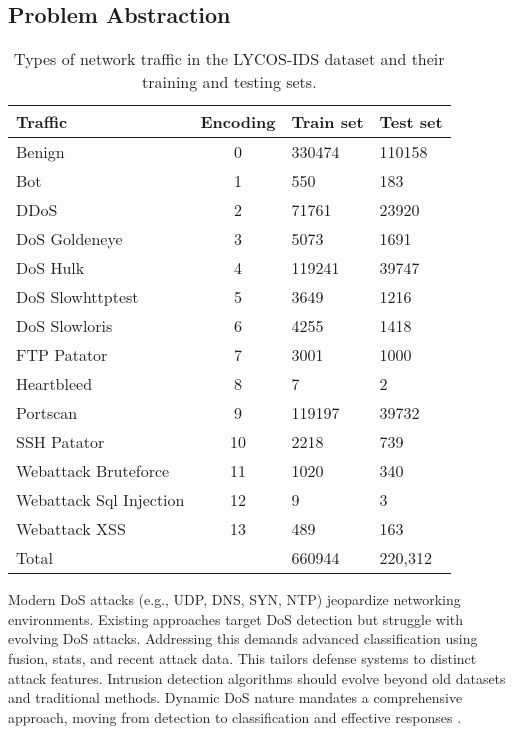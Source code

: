 \subsection{Problem Abstraction}

\begin{table}[h!]
\caption{Types of network traffic in the LYCOS-IDS dataset and their training and testing sets.}
\label{tab:lycos_train_test_split}
\centering
\begin{tabular}{|lcll|}
\hline
Traffic & Encoding & Train set & Test set \\
\hline
Benign & 0 & 330474 & 110158 \\
Bot & 1 & 550 & 183 \\
DDoS & 2 & 71761 & 23920 \\
DoS Goldeneye & 3 & 5073 & 1691 \\
DoS Hulk & 4 & 119241 & 39747 \\
DoS Slowhttptest & 5 & 3649 & 1216 \\
DoS Slowloris & 6 & 4255 & 1418 \\
FTP Patator & 7 & 3001 & 1000 \\
Heartbleed & 8 & 7 & 2 \\
Portscan & 9 & 119197 & 39732 \\
SSH Patator & 10 & 2218 & 739 \\
Webattack Bruteforce & 11 & 1020 & 340 \\
Webattack Sql Injection & 12 & 9 & 3 \\
Webattack XSS & 13 & 489 & 163 \\
\hline
Total & & 660944 &  220,312 \\
\hline
\end{tabular}
\end{table}

Modern DoS attacks (e.g., UDP, DNS, SYN, NTP) jeopardize networking environments. Existing approaches target DoS detection but struggle with evolving DoS attacks. Addressing this demands advanced classification using fusion, stats, and recent attack data. This tailors defense systems to distinct attack features. Intrusion detection algorithms should evolve beyond old datasets and traditional methods. Dynamic DoS nature mandates a comprehensive approach, moving from detection to classification and effective responses \cite{tian2021lightweight}.


